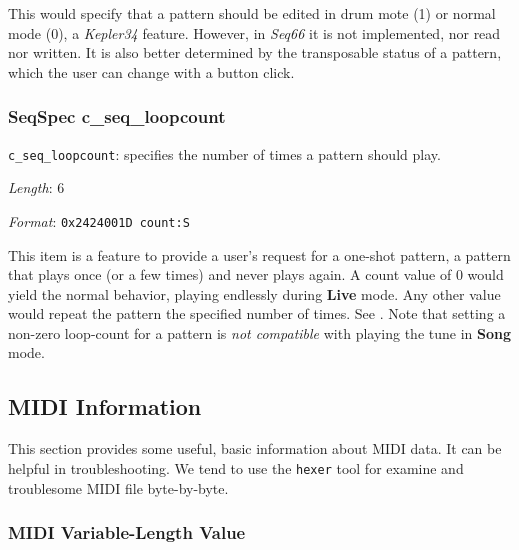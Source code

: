    This would specify that a pattern should be edited in drum
   mote (1) or normal mode (0), a \textsl{Kepler34} feature.
   However, in \textsl{Seq66} it is not implemented, nor read nor written.
   It is also better determined by the transposable status of a pattern,
   which the user can change with a button click.

\subsubsection{SeqSpec c\_seq\_loopcount}
\label{subsubsec:midi_format_track_seqspec_seq_loopcount}

   \begin{description}
      \item \texttt{c\_seq\_loopcount}:
         specifies the number of times a pattern should play.
      \item \textsl{Length}: 6
      \item \textsl{Format}: \texttt{0x2424001D count:S}
   \end{description}

   This item is a feature to provide a user's request for a one-shot
   pattern, a pattern that plays once (or a few times)
   and never plays again.  A count value of 0 would yield
   the normal behavior, playing endlessly during \textbf{Live} mode.
   Any other value would repeat the pattern the specified number of times.
   See .
   Note that setting a non-zero loop-count for a pattern is
   \textsl{not compatible} with playing the tune in \textbf{Song} mode.

\subsection{MIDI Information}
\label{subsec:midi_information}

   This section provides some useful, basic information about MIDI data.
   It can be helpful in troubleshooting.  We tend to use the
   \texttt{hexer} tool for examine and troublesome MIDI file byte-by-byte.

\subsubsection{MIDI Variable-Length Value}
\label{subsubsec:midi_variable_length_value}

